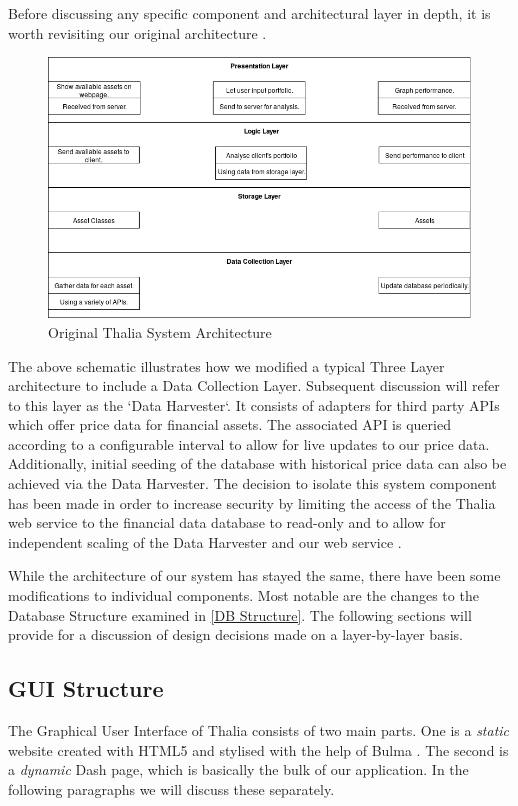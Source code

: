 \documentclass[main.tex]{subfiles}
\begin{document}
Before discussing any specific component and architectural layer in depth, it is worth revisiting our original architecture \cite{TR}.
\begin{figure}[H]
	\includegraphics[width=\textwidth]{04Design/04Pictures/architecture_layer_diagram.png}
    \caption{Original Thalia System Architecture \cite{TR}}
\end{figure}
The above schematic illustrates how we modified a typical Three Layer architecture to include a Data Collection Layer. Subsequent discussion will refer to this layer as the `Data Harvester`. It consists of adapters for third party APIs which offer price data for financial assets. The associated API is queried according to a configurable interval to allow for live updates to our price data. Additionally, initial seeding of the database with historical price data can also be achieved via the Data Harvester. The decision to isolate this system component has been made in order to increase security by limiting the access of the Thalia web service to the financial data database to read-only and to allow for independent scaling of the Data Harvester and our web service \cite{TR}.

While the architecture of our system has stayed the same, there have been some modifications to individual components. Most notable are the changes to the Database Structure examined in \ref{DB Structure}. The following sections will provide for a discussion of design decisions made on a layer-by-layer basis.

\subsection{GUI Structure}

The Graphical User Interface of Thalia consists of two main parts. One is a \emph{static} website created with HTML5 \cite{html5} and stylised with the help of Bulma \cite{bulma}. The second is a \emph{dynamic} Dash \cite{dash} page, which is basically the bulk of our application. In the following paragraphs we will discuss these separately. 
\end{document}
